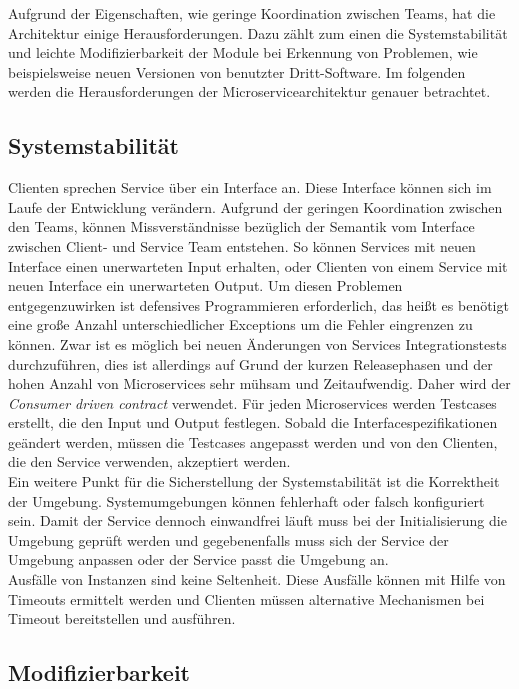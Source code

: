 Aufgrund der Eigenschaften, wie geringe Koordination zwischen Teams, hat die Architektur einige Herausforderungen. Dazu zählt zum einen die Systemstabilität und leichte Modifizierbarkeit der Module bei Erkennung von Problemen, wie beispielsweise neuen Versionen von benutzter Dritt-Software. Im folgenden werden die Herausforderungen der Microservicearchitektur genauer betrachtet.

\subsection{Systemstabilität}

Clienten sprechen Service über ein Interface an. Diese Interface können sich im Laufe der Entwicklung verändern. Aufgrund der geringen Koordination zwischen den Teams, können Missverständnisse bezüglich der Semantik vom Interface zwischen Client- und Service Team entstehen. So können Services mit neuen Interface einen unerwarteten Input erhalten, oder Clienten von einem Service mit neuen Interface ein unerwarteten Output. Um diesen Problemen entgegenzuwirken ist defensives Programmieren erforderlich, das heißt es benötigt eine große Anzahl unterschiedlicher Exceptions um die Fehler eingrenzen zu können. Zwar ist es möglich bei neuen Änderungen von Services Integrationstests durchzuführen, dies ist allerdings auf Grund der kurzen Releasephasen und der hohen Anzahl von Microservices sehr mühsam und Zeitaufwendig. Daher wird der \textit{Consumer driven contract} verwendet. Für jeden Microservices werden Testcases erstellt, die den Input und Output festlegen. Sobald die Interfacespezifikationen geändert werden, müssen die Testcases angepasst werden und von den Clienten, die den Service verwenden, akzeptiert werden. \\
Ein weitere Punkt für die Sicherstellung der Systemstabilität ist die Korrektheit der Umgebung. Systemumgebungen können fehlerhaft oder falsch konfiguriert sein. Damit der Service dennoch einwandfrei läuft muss bei der Initialisierung die Umgebung geprüft werden und gegebenenfalls muss sich der Service der Umgebung anpassen oder der Service passt die Umgebung an.\\
Ausfälle von Instanzen sind keine Seltenheit. Diese Ausfälle können mit Hilfe von Timeouts ermittelt werden und Clienten müssen alternative Mechanismen bei Timeout bereitstellen und ausführen. 

\subsection{Modifizierbarkeit}

